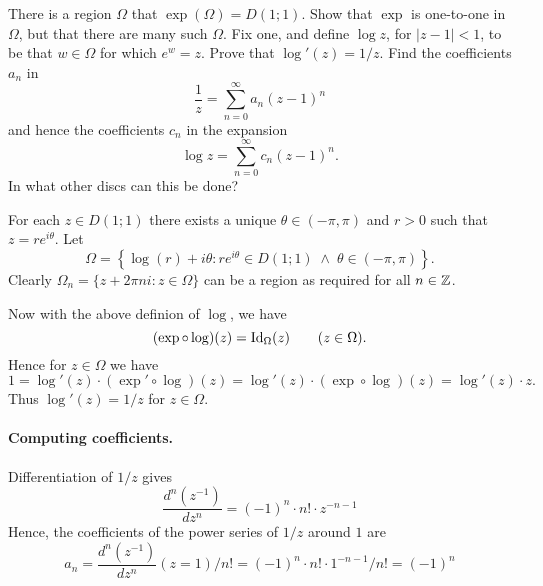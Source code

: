 \begin{enumerate}
\begin{excopy}
There is a region \(\Omega\) that \(\exp(\Omega) = D(1;1)\).
Show that \(\exp\) is one-to-one in \(\Omega\),
but that there are many such \(\Omega\). Fix one, and define
\(\log z\), for \(|z-1|<1\), to be that \(w\in\Omega\) for which \(e^w = z\).
Prove that \(\log'(z) = 1/z\). Find the coefficients \(a_n\) in
\begin{equation*}
\frac{1}{z} = \sum_{n=0}^\infty a_n(z-1)^n
\end{equation*}
and hence the coefficients \(c_n\) in the expansion
\begin{equation*}
\log z = \sum_{n=0}^\infty c_n(z-1)^n.
\end{equation*}
In what other discs can this be done?
\end{excopy}

For each \(z\in D(1;1)\) there exists a unique \(\theta\in (-\pi,\pi)\) 
and \(r>0\) such that \(z=re^{i\theta}\).
Let 
\begin{equation*}
\Omega = \left\{\log(r) + i\theta:  
           re^{i\theta} \in D(1;1) \;\wedge\; \theta\in (-\pi,\pi)\right\}.
\end{equation*}
Clearly \(\Omega_n = \{z + 2\pi ni: z\in \Omega\}\)
can be a region as required for all \(n\in\mathbb{Z}\).

Now with the above definion of \(\log\), we have
\begin{equation*}
(\exp\circ\log)(z) = \mathop{\rm Id}\nolimits_\Omega(z) \qquad (z\in\Omega).
\end{equation*}
Hence for \(z\in\Omega\) we have 
\begin{equation*}
1 
= \log'(z)\cdot (\exp'\circ \log)(z)
= \log'(z)\cdot (\exp\circ \log)(z) 
= \log'(z)\cdot z.
\end{equation*}
Thus \(\log'(z) = 1/z\) for \(z\in \Omega\).

\paragraph{Computing coefficients.}
Differentiation of \(1/z\) gives
\begin{equation*}
\frac{d^n(z^{-1})}{dz^n} = 
 (-1)^n \cdot n!\cdot z^{-n-1}
\end{equation*}
Hence, the coefficients of the power series of \(1/z\) around $1$ are
\begin{equation*}
a_n = \frac{d^n(z^{-1})}{dz^n}(z=1)/n!
=  (-1)^n \cdot n!\cdot 1^{-n-1} / n! = (-1)^n
\end{equation*}


\end{enumerate}
